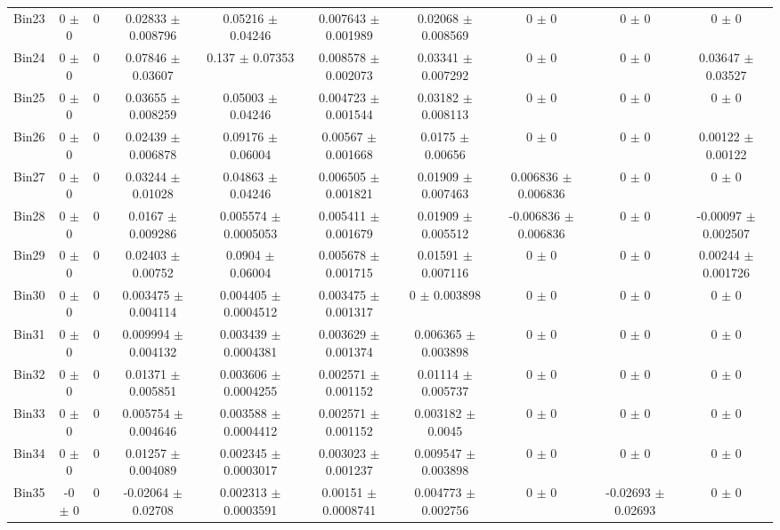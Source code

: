 \begin{tabular}{@{\extracolsep{4pt}}lccccccccc@{}}
     Bin23 & 0 $\pm$ 0 & 0 & 0.02833 $\pm$ 0.008796 & 0.05216 $\pm$ 0.04246 & 0.007643 $\pm$ 0.001989 & 0.02068 $\pm$ 0.008569 & 0 $\pm$ 0 & 0 $\pm$ 0 & 0 $\pm$ 0 \\ 
     Bin24 & 0 $\pm$ 0 & 0 & 0.07846 $\pm$ 0.03607 & 0.137 $\pm$ 0.07353 & 0.008578 $\pm$ 0.002073 & 0.03341 $\pm$ 0.007292 & 0 $\pm$ 0 & 0 $\pm$ 0 & 0.03647 $\pm$ 0.03527 \\ 
     Bin25 & 0 $\pm$ 0 & 0 & 0.03655 $\pm$ 0.008259 & 0.05003 $\pm$ 0.04246 & 0.004723 $\pm$ 0.001544 & 0.03182 $\pm$ 0.008113 & 0 $\pm$ 0 & 0 $\pm$ 0 & 0 $\pm$ 0 \\ 
     Bin26 & 0 $\pm$ 0 & 0 & 0.02439 $\pm$ 0.006878 & 0.09176 $\pm$ 0.06004 & 0.00567 $\pm$ 0.001668 & 0.0175 $\pm$ 0.00656 & 0 $\pm$ 0 & 0 $\pm$ 0 & 0.00122 $\pm$ 0.00122 \\ 
     Bin27 & 0 $\pm$ 0 & 0 & 0.03244 $\pm$ 0.01028 & 0.04863 $\pm$ 0.04246 & 0.006505 $\pm$ 0.001821 & 0.01909 $\pm$ 0.007463 & 0.006836 $\pm$ 0.006836 & 0 $\pm$ 0 & 0 $\pm$ 0 \\ 
     Bin28 & 0 $\pm$ 0 & 0 & 0.0167 $\pm$ 0.009286 & 0.005574 $\pm$ 0.0005053 & 0.005411 $\pm$ 0.001679 & 0.01909 $\pm$ 0.005512 & -0.006836 $\pm$ 0.006836 & 0 $\pm$ 0 & -0.00097 $\pm$ 0.002507 \\ 
     Bin29 & 0 $\pm$ 0 & 0 & 0.02403 $\pm$ 0.00752 & 0.0904 $\pm$ 0.06004 & 0.005678 $\pm$ 0.001715 & 0.01591 $\pm$ 0.007116 & 0 $\pm$ 0 & 0 $\pm$ 0 & 0.00244 $\pm$ 0.001726 \\ 
     Bin30 & 0 $\pm$ 0 & 0 & 0.003475 $\pm$ 0.004114 & 0.004405 $\pm$ 0.0004512 & 0.003475 $\pm$ 0.001317 & 0 $\pm$ 0.003898 & 0 $\pm$ 0 & 0 $\pm$ 0 & 0 $\pm$ 0 \\ 
     Bin31 & 0 $\pm$ 0 & 0 & 0.009994 $\pm$ 0.004132 & 0.003439 $\pm$ 0.0004381 & 0.003629 $\pm$ 0.001374 & 0.006365 $\pm$ 0.003898 & 0 $\pm$ 0 & 0 $\pm$ 0 & 0 $\pm$ 0 \\ 
     Bin32 & 0 $\pm$ 0 & 0 & 0.01371 $\pm$ 0.005851 & 0.003606 $\pm$ 0.0004255 & 0.002571 $\pm$ 0.001152 & 0.01114 $\pm$ 0.005737 & 0 $\pm$ 0 & 0 $\pm$ 0 & 0 $\pm$ 0 \\ 
     Bin33 & 0 $\pm$ 0 & 0 & 0.005754 $\pm$ 0.004646 & 0.003588 $\pm$ 0.0004412 & 0.002571 $\pm$ 0.001152 & 0.003182 $\pm$ 0.0045 & 0 $\pm$ 0 & 0 $\pm$ 0 & 0 $\pm$ 0 \\ 
     Bin34 & 0 $\pm$ 0 & 0 & 0.01257 $\pm$ 0.004089 & 0.002345 $\pm$ 0.0003017 & 0.003023 $\pm$ 0.001237 & 0.009547 $\pm$ 0.003898 & 0 $\pm$ 0 & 0 $\pm$ 0 & 0 $\pm$ 0 \\ 
     Bin35 & -0 $\pm$ 0 & 0 & -0.02064 $\pm$ 0.02708 & 0.002313 $\pm$ 0.0003591 & 0.00151 $\pm$ 0.0008741 & 0.004773 $\pm$ 0.002756 & 0 $\pm$ 0 & -0.02693 $\pm$ 0.02693 & 0 $\pm$ 0 \\ 

\end{tabular}

